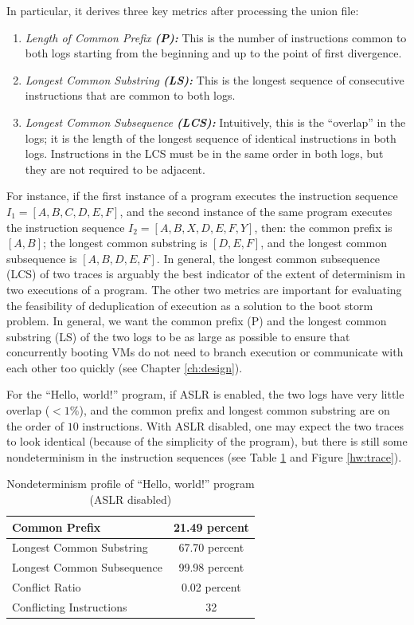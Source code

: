 In particular, it derives three key metrics
after processing the union file:
\begin{enumerate}
\item {\em Length of Common Prefix {\bf (P):}} This is 
the number of instructions common
to both logs starting from the beginning
and up to the point of first divergence.
\item {\em Longest Common Substring {\bf (LS):}}
This is the longest sequence of consecutive instructions 
that are common to both logs.
\item {\em Longest Common Subsequence {\bf (LCS):}}
Intuitively, this is the ``overlap'' in the logs;
it is the length of the longest sequence of identical instructions
in both logs. Instructions in the LCS must be in the same order
in both logs, but they are not required to be adjacent.
\end{enumerate}

For instance, if the first instance of a program
executes the instruction sequence $I_1 = [A, B, C, D, E, F]$,
and the second instance of the same program executes 
the instruction sequence $I_2 = [A, B, X, D, E, F, Y]$,
then: the common prefix is $[A, B]$; the longest
common substring is $[D, E, F]$, and the longest
common subsequence is $[A, B, D, E, F]$. 
In general, the longest common subsequence (LCS) of two traces is
arguably the best indicator of the extent of determinism
in two executions of a program.
The other two metrics are important 
for evaluating the feasibility of deduplication of execution as
a solution to the boot storm problem. In general,
we want the common prefix (P) and the longest common substring (LS)
of the two logs to be as large as possible to
ensure that concurrently booting VMs do not need to branch
execution or communicate with each other too quickly (see Chapter
\ref{ch:design}).

For the ``Hello, world!'' program, if ASLR
is enabled, the two logs have very little
overlap ($< 1\%$), and the common
prefix and longest common substring
are on the order of $10$ instructions.
With ASLR disabled, one may 
expect the two traces to look identical (because
of the simplicity of the program), but
there is still some nondeterminism in the 
instruction sequences (see Table \ref{hw:stats}
and Figure \ref{hw:trace}).

\begin{table}
\caption{Nondeterminism profile of ``Hello, world!'' program (ASLR disabled)}
\label{hw:stats}
\begin{center}
\begin{tabular}{||l|c||}\hline
  Common Prefix & 21.49 percent \\\hline
  Longest Common Substring & 67.70 percent \\\hline
  Longest Common Subsequence & 99.98 percent \\\hline
  Conflict Ratio & 0.02 percent \\\hline
  Conflicting Instructions & 32 \\\hline
\end{tabular}
\end{center}
\end{table}


